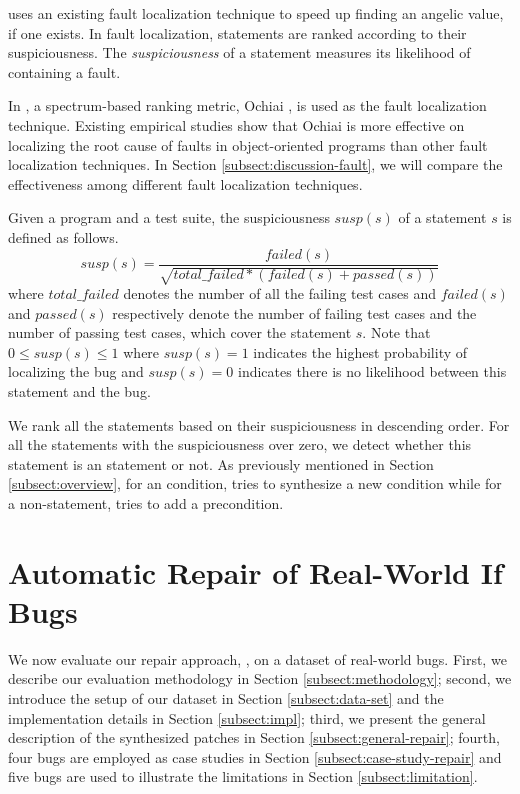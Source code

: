 \nopol uses an existing fault localization technique to speed up finding an angelic value, if one exists. In fault localization, statements are ranked according to their suspiciousness. The \textit{suspiciousness} of a statement measures its likelihood of containing a fault.

In \nopol, a spectrum-based ranking metric, Ochiai \cite{abreu2007accuracy}, is used as the fault localization technique. Existing empirical studies \cite{steimann2013threats,xuan2014learning} show that Ochiai is more effective on localizing the root cause of faults in object-oriented programs than other fault localization techniques. In Section \ref{subsect:discussion-fault}, we will compare the effectiveness among different fault localization techniques.  

Given a program and a test suite, the suspiciousness $susp(s)$ of a statement $s$ is defined as follows. 
\begin{equation*}
susp(s) =  \frac{failed(s)}{\sqrt{total\_failed*(failed(s)+passed(s))}}
\end{equation*}
where $total\_failed$ denotes the number of all the failing test cases and $failed(s)$ and $passed(s)$ respectively denote the number of failing test cases and the number of passing test cases, which cover the statement $s$. Note that $0 \leq susp(s) \leq 1$ where $susp(s)=1$ indicates the highest probability of localizing the bug and $susp(s)=0$ indicates there is no likelihood between this statement and the bug.  

We rank all the statements based on their suspiciousness in descending order. For all the statements with the suspiciousness over zero, we detect whether this statement is an \ourif statement or not. As previously mentioned in Section \ref{subsect:overview}, for an \ourif condition, \nopol tries to synthesize a new condition while for a non-\ourif statement, \nopol tries to add a precondition. 

\section{Automatic Repair of Real-World If Bugs}
\label{sect:evaluation}

We now evaluate our repair approach, \nopol, on a dataset of \numbug real-world bugs. First, we describe our evaluation methodology in Section \ref{subsect:methodology}; second, we introduce the setup of our dataset in Section \ref{subsect:data-set} and the implementation details in Section \ref{subsect:impl}; third, we present the general description of the synthesized patches in Section \ref{subsect:general-repair}; fourth, four bugs are employed as case studies in Section \ref{subsect:case-study-repair} and five bugs are used to illustrate the limitations in Section \ref{subsect:limitation}. 

